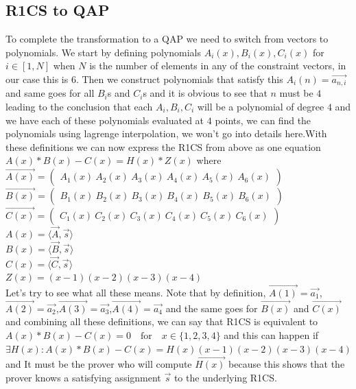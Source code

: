 \documentclass[12pt,letterpaper]{article}
\begin{document}
\subsection{R1CS to QAP}
To complete the transformation to a QAP we need to switch from vectors to polynomials. We start by defining polynomials $A_i(x),B_i(x),C_i(x)$ for $i\in [1,N]$ when $N$ is the number of elements in any of the constraint vectors, in our case this is $6$. Then we construct polynomials that satisfy this $A_i(n)=\vec{a_{n,i}}$ and same goes for all $B_i$s and $C_i$s and it is obvious to see that $n$ must be $4$ leading to the conclusion that each $A_i,B_i,C_i$ will be a polynomial of degree $4$ and we have each of these polynomials evaluated at $4$ points, we can find the polynomials using lagrenge interpolation, we won't go into details here.With these definitions we can now express the R1CS from above as one equation $A(x) \ast B(x) - C(x) = H(x) \ast Z(x)$ where \\
$\vec{A(x)}= \begin{pmatrix} 
A_1(x) \ 
A_2(x) \ 
A_3(x) \ 
A_4(x) \
A_5(x) \ 
A_6(x)
\end{pmatrix}$\\
$\vec{B(x)}= \begin{pmatrix} 
B_1(x) \ 
B_2(x) \ 
B_3(x) \ 
B_4(x) \ 
B_5(x) \ 
B_6(x)
\end{pmatrix}$\\
$\vec{C(x)}= \begin{pmatrix} 
C_1(x) \ 
C_2(x) \ 
C_3(x) \ 
C_4(x) \ 
C_5(x) \ 
C_6(x)
\end{pmatrix}$\\
$A(x) = \langle \vec{A},\vec{s} \rangle$\\
$B(x) = \langle \vec{B},\vec{s} \rangle$\\
$C(x) = \langle \vec{C},\vec{s} \rangle$\\
$Z(x) = (x - 1)(x - 2)(x - 3)(x - 4)$\\
Let's try to see what all these means. Note that by definition, $\vec{A(1)} = \vec{a_1}$,$\vec{A(2)} = \vec{a_2}$,$\vec{A(3)} = \vec{a_3}$,$\vec{A(4)} = \vec{a_4}$ and the same goes for $\vec{B(x)}$ and $\vec{C(x)}$ and combining all these definitions, we can say that R1CS is equivalent to \\
$A(x) \ast B(x) - C(x) = 0 \quad \textrm{for} \quad x \in \{1,2,3,4\}$ and this can happen if \\
$\exists H(x): A(x) \ast B(x) - C(x) = H(x)(x-1)(x-2)(x-3)(x-4)$ and It must be the prover who will compute $\vec{H(x)}$ because this shows that the prover knows a satisfying assignment $\vec{s}$ to the underlying R1CS.
\end{document}
